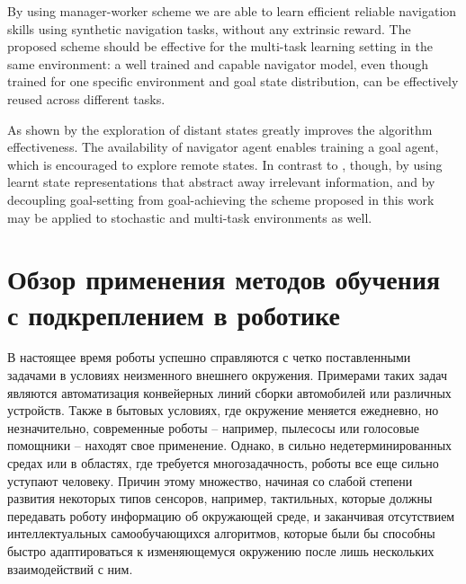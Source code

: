 By using manager-worker scheme we are able to learn efficient reliable navigation skills using synthetic navigation tasks, 
without any extrinsic reward.
%
The proposed scheme should be effective for the multi-task learning setting in the same environment: a well trained and capable navigator model, even though trained for one specific environment and goal state distribution, can be effectively reused across different tasks.

As shown by \citet{ecoffet_first_2021} the exploration of distant states greatly improves the algorithm effectiveness. The availability of navigator agent enables training a goal agent, which is encouraged to explore remote states.
%
In contrast to \citep{ecoffet_first_2021}, though, by using learnt state representations that abstract away irrelevant information, and by decoupling goal-setting from goal-achieving the scheme proposed in this work may be applied to stochastic and multi-task environments as well.

\section{Обзор применения методов обучения с подкреплением в роботике}\label{sec:ch1/sec2}

В настоящее время роботы успешно справляются с четко поставленными задачами в условиях неизменного внешнего окружения. Примерами таких задач являются автоматизация конвейерных линий сборки автомобилей или различных устройств. Также в бытовых условиях, где окружение меняется ежедневно, но незначительно, современные роботы – например, пылесосы или голосовые помощники – находят свое применение. Однако, в сильно недетерминированных средах или в областях, где требуется многозадачность, роботы все еще сильно уступают человеку. Причин этому множество, начиная со слабой степени развития некоторых типов сенсоров, например, тактильных, которые должны передавать роботу информацию об окружающей среде, и заканчивая отсутствием интеллектуальных самообучающихся алгоритмов, которые были бы способны быстро адаптироваться к изменяющемуся окружению после лишь нескольких взаимодействий с ним. 

